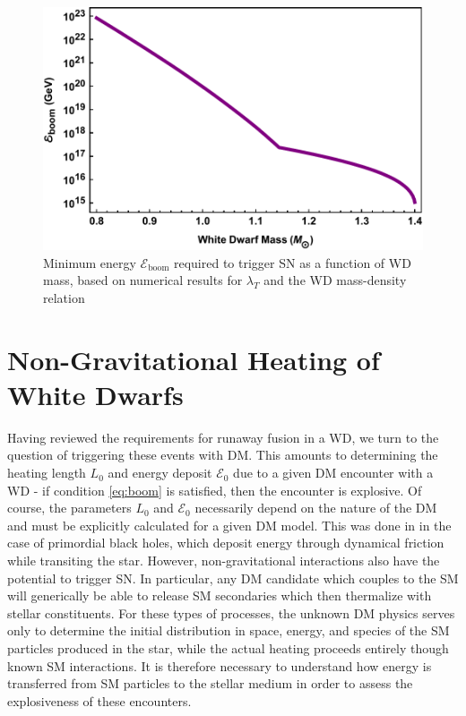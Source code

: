 \documentclass[twocolumn,preprintnumbers,amsmath,amssymb,prl, superscriptaddress]{revtex4}
\newcommand{\Ez}{\mathcal{E}_0}
\newcommand{\Eboom}{\mathcal{E}_\text{boom}}
\begin{document}
\begin{figure}
\includegraphics[scale=.45]{Eboom.pdf}
\caption{Minimum energy $\Eboom$ required to trigger SN as a function of WD mass, based on numerical results for $\lambda_T$ \cite{Woosley} and the WD mass-density relation \cite{cococubed}}
\label{fig:Eboom}
\end{figure}

\section{Non-Gravitational Heating of White Dwarfs}
\label{sec:SMHeating}

Having reviewed the requirements for runaway fusion in a WD, we turn to the question of triggering these events with DM.
This amounts to determining the heating length $L_0$ and energy deposit $\Ez$ due to a given DM encounter with a WD - if condition \eqref{eq:boom} is satisfied, then the encounter is explosive.
Of course, the parameters $L_0$ and $\Ez$ necessarily depend on the nature of the DM and must be explicitly calculated for a given DM model.
This was done in \cite{Graham:2015apa} in the case of primordial black holes, which deposit energy through dynamical friction while transiting the star.
However, non-gravitational interactions also have the potential to trigger SN.
In particular, any DM candidate which couples to the SM will generically be able to release SM secondaries which then thermalize with stellar constituents.
For these types of processes, the unknown DM physics serves only to determine the initial distribution in space, energy, and species of the SM particles produced in the star, while the actual heating proceeds entirely though known SM interactions.
It is therefore necessary to understand how energy is transferred from SM particles to the stellar medium in order to assess the explosiveness of these encounters.
\end{document}
